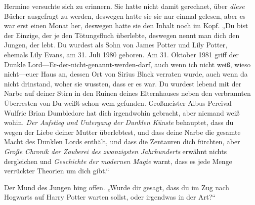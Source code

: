 Hermine versuchte sich zu erinnern. Sie hatte nicht damit gerechnet, über \emph{diese} Bücher ausgefragt zu werden, deswegen hatte sie sie nur einmal gelesen, aber es war erst einen Monat her, deswegen hatte sie den Inhalt noch im Kopf. „Du bist der Einzige, der je den Tötungsfluch überlebte, deswegen nennt man dich den Jungen, der lebt. Du wurdest als Sohn von James Potter und Lily Potter, ehemals Lily Evans, am 31. Juli 1980 geboren. Am 31. Oktober 1981 griff der Dunkle Lord—Er-der-nicht-genannt-werden-darf, auch wenn ich nicht weiß, wieso nicht—euer Haus an, dessen Ort von Sirius Black verraten wurde, auch wenn da nicht drinstand, woher sie wussten, dass er es war. Du wurdest lebend mit der Narbe auf deiner Stirn in den Ruinen deines Elternhauses neben den verbrannten Überresten von Du-weißt-schon-wem gefunden. Großmeister Albus Percival Wulfric Brian Dumbledore hat dich irgendwohin gebracht, aber niemand weiß wohin. \emph{Der Aufstieg und Untergang der Dunklen Künste} behauptet, dass du wegen der Liebe deiner Mutter überlebtest, und dass deine Narbe die gesamte Macht des Dunklen Lords enthält, und dass die Zentauren dich fürchten, aber \emph{Große Chronik der Zauberei des zwanzigsten Jahrhunderts} erwähnt nichts dergleichen und \emph{Geschichte der modernen Magie} warnt, dass es jede Menge verrückter Theorien um dich gibt.“

Der Mund des Jungen hing offen. „Wurde dir gesagt, dass du im Zug nach Hogwarts auf Harry Potter warten sollst, oder irgendwas in der Art?“

